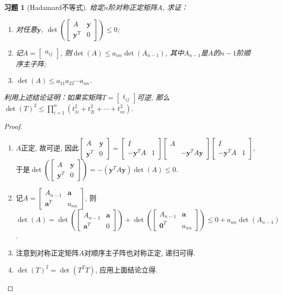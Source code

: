 \documentclass{ctexart}
\newtheorem{exercise}[thm]{习题}
\newcommand\bs[1]{\boldsymbol{ #1}}
\newcommand\note[1]{\par {\footnotesize\kaishu 注意：#1}}
\DeclareMathOperator{\T}{T}
\begin{document}
\begin{exercise}[{{Hadamard不等式}}]
给定$n$阶对称正定矩阵$A$, 求证：
\begin{enumerate}
\item 对任意$\bs y$, $\det\left(\begin{bmatrix}
A & \bs y  \\ \bs y^{\T} & 0
\end{bmatrix}\right)\le0$; 
\item 记$A=\begin{bmatrix}
a_{ij}
\end{bmatrix}$, 则$\det(A) \le a_{nn} \det(A_{n-1})$, 其中$A_{n-1}$是$A$的$n-1$阶顺序主子阵; 
\item $\det(A) \le a_{11}a_{22}\cdots a_{nn}$. 
\end{enumerate}
利用上述结论证明：如果实矩阵$T=\begin{bmatrix}
t_{ij}
\end{bmatrix}$可逆, 那么$\det(T)^2 \le \prod\limits_{i=1}^{n}(t_{1i}^2+t_{2i}^2+\cdots+t_{ni}^2)$. 

\end{exercise}
\begin{proof}
	\begin{enumerate}
		\item $A$正定, 故可逆, 因此$\begin{bmatrix}
				A & \bs y\\ \bs y^T & 0
		\end{bmatrix}=\begin{bmatrix}
		I & \\ -\bs y^TA& 1
		\end{bmatrix}\begin{bmatrix}
		A & \\ & -\bs y^TA\bs y
		\end{bmatrix}\begin{bmatrix}
		I & \\ -\bs y^TA& 1
	\end{bmatrix}$, 于是$\det\left( \begin{bmatrix}
				A & \bs y\\ \bs y^T & 0
		\end{bmatrix} \right)=-(\bs y^TA\bs y)\det(A)\le 0$. 
	\item 记$A=\begin{bmatrix}
			A_{n-1} & \bs a\\ \bs a^T & a_{nn}
			\end{bmatrix}$, 则$\det(A)=\det\left(\begin{bmatrix}
			A_{n-1} & \bs a\\ \bs a^T & 0
		\end{bmatrix}\right)+\det\left(\begin{bmatrix}
		A_{n-1} & \bs a\\ \bs 0^T & a_{nn}
\end{bmatrix}\right)\le 0+a_{nn}\det(A_{n-1})$. 
\item 注意到对称正定矩阵$A$对顺序主子阵也对称正定, 递归可得. 
\item $\det(T)^2=\det(T^TT)$, 应用上面结论立得. 
	\end{enumerate}
\end{proof}
\end{document}
